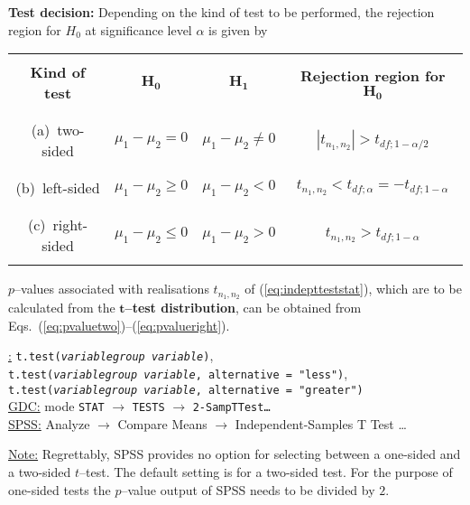 \medskip
\noindent
\textbf{Test decision:} Depending on the kind of test to be 
performed, the rejection region for $H_{0}$ at significance level 
$\alpha$ is given by
%
\begin{center}
\begin{tabular}[h!]{c|c|c|c}
 & & & \\
\textbf{Kind of test} & $\boldsymbol{H_{0}}$ &
$\boldsymbol{H_{1}}$ &
\textbf{Rejection region for} $\boldsymbol{H_{0}}$ \\
 & & & \\
\hline
 & & & \\
(a)~two-sided & $\mu_{1}-\mu_{2}=0$ & $\mu_{1}-\mu_{2}\neq 0$ &
$|t_{n_{1},n_{2}}|>t_{df;1-\alpha/2}$ \\
 & & & \\
\hline
 & & & \\
(b)~left-sided & $\mu_{1}-\mu_{2}\geq 0$ & $\mu_{1}-\mu_{2}<0$ &
$t_{n_{1},n_{2}}<t_{df;\alpha}=-t_{df;1-\alpha}$ \\
 & & & \\
\hline
 & & & \\
(c)~right-sided & $\mu_{1}-\mu_{2}\leq 0$ & $\mu_{1}-\mu_{2}>0$ &
$t_{n_{1},n_{2}}>t_{df;1-\alpha}$ \\
 & & &
\end{tabular}
\end{center}
%
$p$--values associated with realisations $t_{n_{1},n_{2}}$ of 
(\ref{eq:indeptteststat}), which are to be calculated from the
$\boldsymbol{t}$\textbf{--test distribution}, can be obtained from 
Eqs.~(\ref{eq:pvaluetwo})--(\ref{eq:pvalueright}).

\medskip
\noindent
\underline{\R:}
\texttt{t.test(\textit{variable}\texttildelow\textit{group
variable})}, \\
\texttt{t.test(\textit{variable}\texttildelow\textit{group
variable}, alternative = "less")}, \\
\texttt{t.test(\textit{variable}\texttildelow\textit{group
variable}, alternative = "greater")} \\
\underline{GDC:} mode \texttt{STAT} $\rightarrow$ \texttt{TESTS}
$\rightarrow$ \texttt{2-SampTTest\ldots} \\
\underline{SPSS:} Analyze $\rightarrow$ Compare Means
$\rightarrow$ Independent-Samples T Test \ldots

\medskip
\noindent
\underline{Note:} Regrettably, SPSS provides no option for 
selecting between a one-sided and a two-sided $t$--test. The 
default setting is for a two-sided test. For the purpose of 
one-sided tests the $p$--value output of SPSS needs to be divided 
by $2$.

